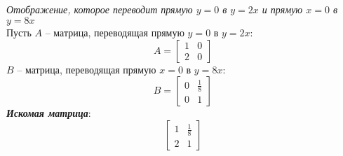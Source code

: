 \documentclass[a5paper, 10pt]{article}
\theoremstyle{definition}
\theoremstyle{plain}
\theoremstyle{remark}
\begin{document}
\subsection{}
\textit{Отображение, которое переводит прямую $y=0$ в $y=2x$ и прямую $x=0$ в $y=8x$}\\
Пусть $A$ -- матрица, переводящая прямую $y=0$ в $y=2x$:
\begin{equation}
A=
\begin{bmatrix}
1 & 0\\
2 & 0
\end{bmatrix}
\end{equation}
$B$ -- матрица, переводящая прямую $x=0$ в $y=8x$:
\begin{equation}
B=
\begin{bmatrix}
0 & \frac{1}{8}\\
0 & 1
\end{bmatrix}
\end{equation}
\textit{\textbf{Искомая матрица}}:
\begin{equation}
\begin{bmatrix}
1 &  \frac{1}{8}\\
2 & 1
\end{bmatrix}
\end{equation}
\end{document}
